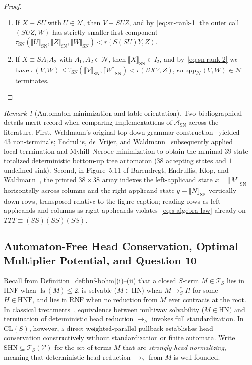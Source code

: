 \documentclass[11pt,reqno]{amsart}
\numberwithin{equation}{section}
\theoremstyle{plain}
\theoremstyle{definition}
\theoremstyle{remark}
\newtheorem{remark}[theorem]{Remark}
\DeclareMathOperator{\ls}{ls}
\newcommand{\CLS}{\mathrm{CL}(S)}
\newcommand{\TS}{\mathcal{T}_S}
\newcommand{\TSV}{\mathcal{T}_S(\mathcal{V})}
\newcommand{\HNF}{\mathrm{HNF}}
\newcommand{\RNF}{\mathrm{RNF}}
\newcommand{\SN}{\mathrm{SN}}
\newcommand{\HN}{\mathrm{HN}}
\newcommand{\sem}[1]{\llbracket #1 \rrbracket}
\newcommand{\redSs}{\to_S^*}
\begin{document}
\begin{proof}
\begin{enumerate}[label=(\roman*),leftmargin=2.2em]
  \item If $X \equiv S U$ with $U \in \mathcal{N}$, then $V \equiv S U Z$, and by~\eqref{eq:sn-rank-1} the outer call $(S U Z, W)$ has strictly smaller first component $\tau_{\SN}(\sem{U}_{\SN}, \sem{Z}_{\SN}, \sem{W}_{\SN}) < r(S(S U)Y, Z)$.
  \item If $X \equiv S A_1 A_2$ with $A_1, A_2 \in \mathcal{N}$, then $\sem{X}_{\SN} \in I_2$, and by~\eqref{eq:sn-rank-2} we have $r(V, W) \le \hat{\tau}_{\SN}(\sem{V}_{\SN}, \sem{W}_{\SN}) < r(S X Y, Z)$, so $\mathrm{app}_{\mathcal{N}}(V, W) \in \mathcal{N}$ terminates. \qedhere
\end{enumerate}
\end{proof}

\begin{remark}[Automaton minimization and table orientation]\label{rem:sn-history}
Two bibliographical details merit record when comparing implementations of $\mathcal{A}_{\SN}$ across the literature. First, Waldmann's original top-down grammar construction~\cite{Waldmann1998Thesis,Waldmann2000} yielded $43$ non-terminals; Endrullis, de~Vrijer, and Waldmann~\cite[Section~5, p.~15]{EndrullisDeVrijerWaldmann2010} subsequently applied local termination and Myhill--Nerode minimization to obtain the minimal $39$-state totalized deterministic bottom-up tree automaton ($38$ accepting states and $1$ undefined sink). Second, in Figure~5.11 of Barendregt, Endrullis, Klop, and Waldmann~\cite[p.~82]{BarendregtEndrullisKlopWaldmann2017}, the printed $38 \times 38$ array indexes the left-applicand state $x = \sem{M}_{\SN}$ horizontally across columns and the right-applicand state $y = \sem{N}_{\SN}$ vertically down rows, transposed relative to the figure caption; reading rows as left applicands and columns as right applicands violates~\eqref{eq:s-algebra-law} already on $T T T \equiv (S S)(S S)(S S)$.
\end{remark}

\subsection{Automaton-Free Head Conservation, Optimal Multiplier Potential, and Question 10}\label{subsec:hn-q10}

Recall from Definition~\ref{def:hnf-bohm}(i)--(ii) that a closed $S$-term $M \in \TS$ lies in $\HNF$ when $\ls(M) \le 2$, is solvable ($M \in \HN$) when $M \redSs H$ for some $H \in \HNF$, and lies in $\RNF$ when no reduction from $M$ ever contracts at the root. In classical treatments~\cite{Barendregt1984}, equivalence between multiway solvability ($M \in \HN$) and termination of deterministic head reduction $\to_h$ invokes full standardization. In $\CLS$, however, a direct weighted-parallel pullback establishes head conservation constructively without standardization or finite automata. Write $\mathrm{SHN} \subseteq \TSV$ for the set of terms $M$ that are \emph{strongly head-normalizing}, meaning that deterministic head reduction $\to_h$ from $M$ is well-founded.
\end{document}
